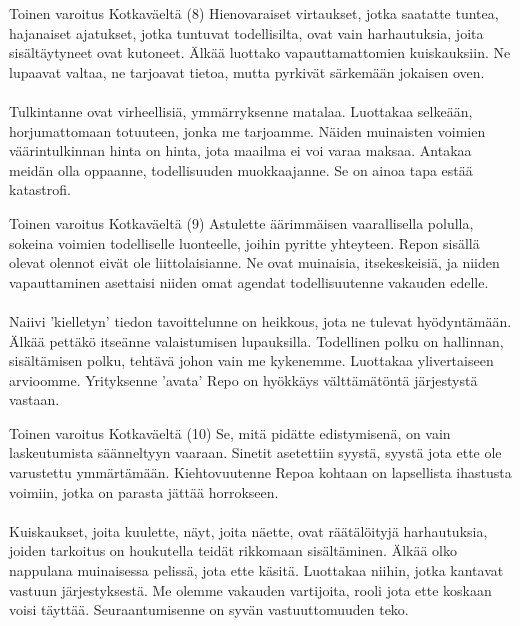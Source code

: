\documentclass[a4paper,12pt]{article}
\begin{document}
\begin{biginfobox}{Toinen varoitus Kotkaväeltä (8)}
Hienovaraiset virtaukset, jotka saatatte tuntea, hajanaiset ajatukset, jotka tuntuvat todellisilta, ovat vain harhautuksia, joita sisältäytyneet ovat kutoneet. Älkää luottako vapauttamattomien kuiskauksiin. Ne lupaavat valtaa, ne tarjoavat tietoa, mutta pyrkivät särkemään jokaisen oven.\\
\\
Tulkintanne ovat virheellisiä, ymmärryksenne matalaa. Luottakaa selkeään, horjumattomaan totuuteen, jonka me tarjoamme. Näiden muinaisten voimien väärintulkinnan hinta on hinta, jota maailma ei voi varaa maksaa. Antakaa meidän olla oppaanne, todellisuuden muokkaajanne. Se on ainoa tapa estää katastrofi.
\end{biginfobox}

\begin{biginfobox}{Toinen varoitus Kotkaväeltä (9)}
Astulette äärimmäisen vaarallisella polulla, sokeina voimien todelliselle luonteelle, joihin pyritte yhteyteen. Repon sisällä olevat olennot eivät ole liittolaisianne. Ne ovat muinaisia, itsekeskeisiä, ja niiden vapauttaminen asettaisi niiden omat agendat todellisuutenne vakauden edelle.\\
\\
Naiivi 'kielletyn' tiedon tavoittelunne on heikkous, jota ne tulevat hyödyntämään. Älkää pettäkö itseänne valaistumisen lupauksilla. Todellinen polku on hallinnan, sisältämisen polku, tehtävä johon vain me kykenemme. Luottakaa ylivertaiseen arvioomme. Yrityksenne 'avata' Repo on hyökkäys välttämätöntä järjestystä vastaan.
\end{biginfobox}

\begin{biginfobox}{Toinen varoitus Kotkaväeltä (10)}
Se, mitä pidätte edistymisenä, on vain laskeutumista säänneltyyn vaaraan. Sinetit asetettiin syystä, syystä jota ette ole varustettu ymmärtämään. Kiehtovuutenne Repoa kohtaan on lapsellista ihastusta voimiin, jotka on parasta jättää horrokseen.\\
\\
Kuiskaukset, joita kuulette, näyt, joita näette, ovat räätälöityjä harhautuksia, joiden tarkoitus on houkutella teidät rikkomaan sisältäminen. Älkää olko nappulana muinaisessa pelissä, jota ette käsitä. Luottakaa niihin, jotka kantavat vastuun järjestyksestä. Me olemme vakauden vartijoita, rooli jota ette koskaan voisi täyttää. Seuraantumisenne on syvän vastuuttomuuden teko.
\end{biginfobox}
\end{document}
